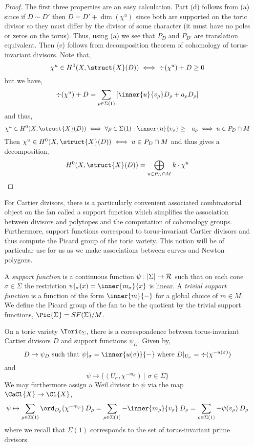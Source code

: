 \begin{proof}
The first three properties are an easy calculation. Part (d) follows from (a) since if $D \sim D'$ then $D = D' + \dim{(\chi^u)}$ since both are supported on the toric divisor so they must differ by the divisor of some character (it must have no poles or zeros on the torus). Thus, using (a) we see that $P_D$ and $P_{D'}$ are translation equivalent. Then (e) follows from decomposition theorem of cohomology of torus-invariant divisors. Note that,
\[ \chi^u \in H^0(X, \struct{X}(D)) \iff \div{(\chi^u)} + D \ge 0 \]
but we have,
\[ \div{(\chi^u)} + D = \sum_{\rho \in \Sigma(1)} \left[ \inner{u}{v_\rho} D_\rho + a_\rho D_\rho \right] \]
and thus,
\[ \chi^u \in H^0(X, \struct{X}(D)) \iff \forall \rho \in \Sigma(1) : \inner{n}{v_\rho} \ge -a_\rho \iff u \in P_D \cap M \] 
Then $\chi^u \in H^0(X, \struct{X}(D)) \iff u \in P_D \cap M$ and thus gives a decomposition,
\[ H^0(X, \struct{X}(D)) = \bigoplus_{u \in P_D \cap M} k \cdot \chi^u \]
\end{proof} 
\noindent
For Cartier divisors, there is a particularly convenient associated combinatorial object on the fan called a support function which simplifies the association between divisors and polytopes and the computation of cohomology groups. Furthermore, support functions correspond to torus-invariant Cartier divisors and thus compute the Picard group of the toric variety. This notion will be of particular use for us as we make associations between curves and Newton polygons.

\begin{definition}
A \textit{support function} is a continuous function $\psi : |\Sigma| \to \mathcal{R}$ such that on each cone $\sigma \in \Sigma$ the restriction $\psi |_\sigma(x) = \inner{m_\sigma}{x}$ is linear. A \textit{trivial support function} is a function of the form $\inner{m}{-}$ for  a global choice of $m \in M$. We define the Picard group of the fan to be the quotient by the trivial support functions, $\Pic{\Sigma} = SF(\Sigma) / M$. 
\end{definition}

\begin{proposition}
On a toric variety $\Toric_\Sigma$, there is a correspondence between torus-invariant Cartier divisors $D$ and support functions $\psi_D$. Given by,
\[ D \mapsto \psi_D \text{ such that } \psi|_\sigma = \inner{u(\sigma)}{-} \text{ where } D |_{U_\sigma} =  \div{(\chi^{-u(\sigma)})} \]
and
\[ \psi \mapsto \{ (U_\sigma, \chi^{-m_\sigma}) \mid \sigma \in \Sigma \} \] 
We may furthermore assign a Weil divisor to $\psi$ via the map $\CaCl{X} \to \Cl{X}$,
\[ \psi \mapsto \sum_{\rho \in \Sigma(1)} \ord_{D_\rho}(\chi^{-m_\rho}) \: D_\rho = \sum_{\rho \in \Sigma(1)} -\inner{m_\rho}{v_\rho} \: D_\rho = \sum_{\rho \in \Sigma(1)} -\psi(v_\rho) \: D_\rho \] 
where we recall that $\Sigma(1)$ corresponds to the set of torus-invariant prime divisors.
\end{proposition}

